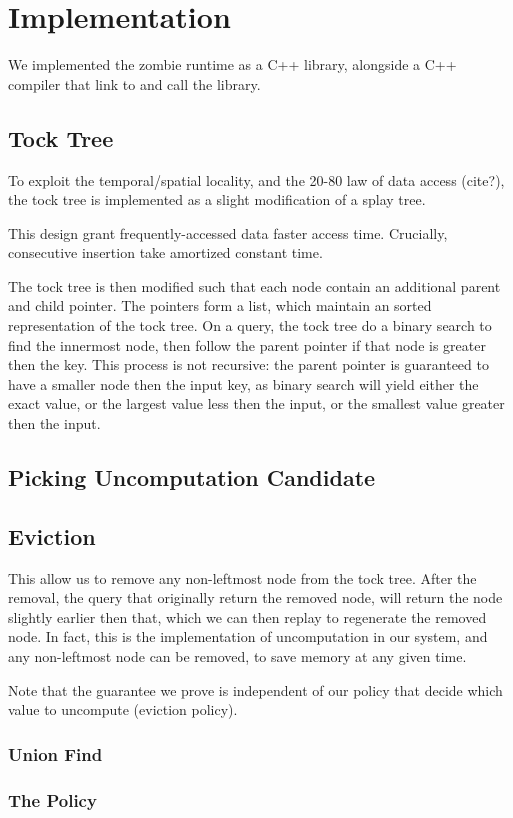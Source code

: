 \section{Implementation}
We implemented the zombie runtime as a C++ library, alongside a C++ compiler that link to and call the library.
\subsection{Tock Tree}
To exploit the temporal/spatial locality, and the 20-80 law of data access (cite?), the tock tree is implemented as a slight modification of a splay tree.

This design grant frequently-accessed data faster access time. Crucially, consecutive insertion take amortized constant time.

The tock tree is then modified such that each node contain an additional parent and child pointer. The pointers form a list, which maintain an sorted representation of the tock tree. On a query, the tock tree do a binary search to find the innermost node, then follow the parent pointer if that node is greater then the key. This process is not recursive: the parent pointer is guaranteed to have a smaller node then the input key, as binary search will yield either the exact value, or the largest value less then the input, or the smallest value greater then the input.
\subsection{Picking Uncomputation Candidate}
\subsection{Eviction}
This allow us to remove any non-leftmost node from the tock tree. After the removal, the query that originally return the removed node, will return the node slightly earlier then that, which we can then replay to regenerate the removed node. In fact, this is the implementation of uncomputation in our system, and any non-leftmost node can be removed, to save memory at any given time.

Note that the guarantee we prove is independent of our policy that decide which value to uncompute (eviction policy).
\subsubsection{Union Find}
\subsubsection{The Policy}
